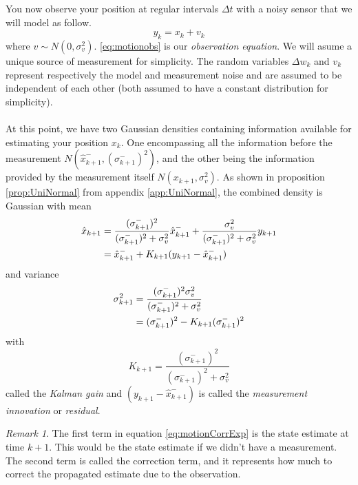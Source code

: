 \documentclass{article}
\theoremstyle{definition}
\theoremstyle{remark}
\newtheorem{remark}[thm]{Remark}
\begin{document}
You now observe your position at regular intervals $\Delta t$ with a noisy sensor that we will model as follow.
\begin{equation}\label{eq:motionobs}
y_k=x_k+v_k
\end{equation}
where $v \sim N(0,\sigma_v^2)$.
\eqref{eq:motionobs} is our \textit{observation equation}. We will asume a unique source of measurement for simplicity.
The random variables $\Delta w_k$ and $v_k$ represent respectively the model and measurement noise and are assumed to be independent of each other (both assumed to have a constant distribution for simplicity).\\
\\
At this point, we have two Gaussian densities containing information available for estimating your position $x_k$. One encompassing all the information before the measurement $N(\hat{x}_{k+1}^-,(\sigma_{k+1}^-)^2)$, and the other being the information provided by the measurement itself $N(x_{k+1},\sigma_v^2)$. As shown in proposition \ref{prop:UniNormal} from appendix \ref{app:UniNormal}, the combined density is Gaussian with mean
\begin{align}\label{eq:motionCorrExp}
\hat{x}_{k+1}&=\frac{(\sigma_{k+1}^-)^2}{(\sigma_{k+1}^-)^2+\sigma_v^2} \hat{x}_{k+1}^-+\frac{\sigma_v^2}{(\sigma_{k+1}^-)^2+\sigma_v^2}y_{k+1} \notag\\
&=\hat{x}_{k+1}^-+K_{k+1}(y_{k+1}-\hat{x}_{k+1}^-)
\end{align}
and variance
\begin{align}\label{eq:motionCorrVar}
\sigma_{k+1}^2&=\frac{(\sigma_{k+1}^-)^2\sigma_v^2}{(\sigma_{k+1}^-)^2+\sigma_v^2} \notag \\
&=(\sigma_{k+1}^-)^2-K_{k+1}(\sigma_{k+1}^-)^2
\end{align}
with 
$$K_{k+1}=\frac{(\sigma_{k+1}^-)^2}{(\sigma_{k+1}^-)^2+\sigma_v^2}$$ called the \textit{Kalman gain} and $(y_{k+1}-\hat{x}_{k+1}^-)$ is called the \textit{measurement innovation} or \textit{residual}. 
\\
\begin{remark}
The first term in equation \eqref{eq:motionCorrExp} is the state estimate at time $k+1$. This would be the state estimate if we didn't have a measurement. %
The second term is called the correction term, and it represents how much to correct the propagated estimate due to the observation.
\end{remark}
\end{document}

